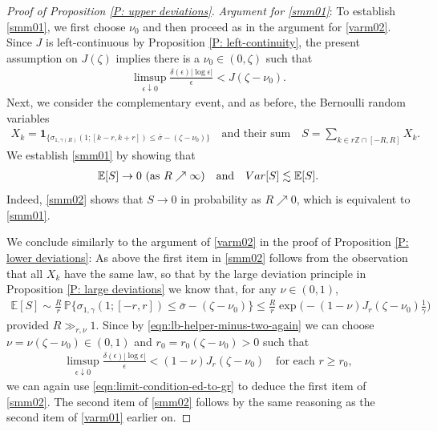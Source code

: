 \documentclass[10pt,a4paper]{amsart}
\begin{document}
\begin{proof}[Proof of Proposition \ref{P: upper deviations}]
			\textit{Argument for \eqref{smm01}}: To establish \eqref{smm01}, we first choose $\nu_{0}$ and then proceed as in the argument for \eqref{varm02}.  Since $J$ is left-continuous by Proposition \ref{P: left-continuity}, the present assumption on $J(\zeta)$ implies there is a $\nu_{0} \in (0, \zeta)$ such that 
				\begin{align} \label{eqn:lb-helper-minus-two-again}
					\limsup_{ \epsilon \downarrow 0 } \frac{ \delta(\epsilon) |\log \epsilon| }{ \epsilon } < J ( \zeta - \nu_{0} ).
				\end{align}
			Next, we consider the complementary event, and as before, the Bernoulli random variables
			\begin{align*}
				X_{ k } = \boldsymbol{1}_{ \{  \sigma_{ 1 , \gamma(R) } ( 1; [ k - r , k + r ] ) \leq \bar{\sigma} - ( \zeta - \nu_{0} ) \} } 
				\quad \text{and their sum} \quad
				S = \sum_{ k \in r \mathbb{Z} \cap [ - R , R  ] } X_k .
			\end{align*}
			We establish \eqref{smm01} by showing that
			\begin{align}\label{smm02}
				 \mathbb{E} [ S ] \rightarrow 0 ~ ( \text{as} ~ R \nearrow \infty )
				 \quad \text{and} \quad
				 { \rm Var } [ S ] \lesssim \mathbb{E} [ S ] .
			\end{align}
			Indeed, \eqref{smm02} shows that $ S \rightarrow 0 $ in probability as $ R \nearrow 0 $, which is equivalent to \eqref{smm01}.
			
			We conclude similarly to the argument of \eqref{varm02} in the proof of Proposition \ref{P: lower deviations}: As above the first item in \eqref{smm02} follows from the observation that all $ X_k $ have the same law, so that by the large deviation principle in Proposition \ref{P: large deviations} we know that, for any $\nu \in (0,1)$,
			\begin{align*}
				\mathbb{E} [ S ] 
				\sim \frac{ R }{ r } \, \mathbb{P} \big\{  \sigma_{ 1 , \gamma } ( 1;  [ - r , r ] ) \leq \bar{\sigma} - ( \zeta - \nu_{0} ) \big\} 
				\leq  \frac{ R }{ r } \exp \Big( - ( 1 - \nu ) J_{ r } ( \zeta - \nu_{0} ) \frac{ 1 }{ \gamma } \Big) 
			\end{align*}
			provided $R \gg_{r,\nu} 1$.  Since by \eqref{eqn:lb-helper-minus-two-again} we can choose $\nu = \nu(\zeta - \nu_{0}) \in (0,1)$ and $r_{0} = r_{0}(\zeta-\nu_{0}) > 0$ such that 
				\begin{align*}
					\limsup_{ \epsilon \downarrow 0 } \frac{ \delta(\epsilon) |\log \epsilon| }{ \epsilon } < ( 1 - \nu ) J_{r} ( \zeta - \nu_{0} ) \quad \text{for each} \, \, r \geq r_{0},
				\end{align*}
			we can again use \eqref{eqn:limit-condition-ed-to-gr} to deduce the first item of \eqref{smm02}. The second item of \eqref{smm02} follows by the same reasoning as the second item of \eqref{varm01} earlier on.
		\end{proof}
\end{document}
